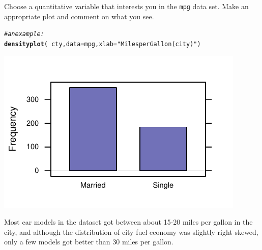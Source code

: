 \documentclass[twoside]{book}\usepackage[]{graphicx}\usepackage[]{xcolor}
\makeatletter
\def\maxwidth{ %
  \ifdim\Gin@nat@width>\linewidth
    \linewidth
  \else
    \Gin@nat@width
  \fi
}
\newcommand{\hlstr}[1]{\textcolor[rgb]{0.192,0.494,0.8}{#1}}%
\newcommand{\hlcom}[1]{\textcolor[rgb]{0.678,0.584,0.686}{\textit{#1}}}%
\newcommand{\hlopt}[1]{\textcolor[rgb]{0,0,0}{#1}}%
\newcommand{\hlstd}[1]{\textcolor[rgb]{0.345,0.345,0.345}{#1}}%
\newcommand{\hlkwc}[1]{\textcolor[rgb]{0.333,0.667,0.333}{#1}}%
\newcommand{\hlkwd}[1]{\textcolor[rgb]{0.737,0.353,0.396}{\textbf{#1}}}%
\newenvironment{kframe}{%
 \def\at@end@of@kframe{}%
 \ifinner\ifhmode%
  \def\at@end@of@kframe{\end{minipage}}%
  \begin{minipage}{\columnwidth}%
 \fi\fi%
 \def\FrameCommand##1{\hskip\@totalleftmargin \hskip-\fboxsep
 \colorbox{shadecolor}{##1}\hskip-\fboxsep
     \hskip-\linewidth \hskip-\@totalleftmargin \hskip\columnwidth}%
 \MakeFramed {\advance\hsize-\width
   \@totalleftmargin\z@ \linewidth\hsize
   \@setminipage}}%
 {\par\unskip\endMakeFramed%
 \at@end@of@kframe}
\newenvironment{knitrout}{}{} %
\newcommand{\Rindex}[1]{\index{\texttt{#1}}}
\newcommand{\dataframe}[1]{{\color{blue!80!black}\texttt{#1}}\Rindex{#1}}
\newcounter{example}[section]
\makeatother
\begin{document}
\begin{problem}
	Choose a quantitative variable that interests you in the \dataframe{mpg}
	data set.  Make an appropriate plot and comment on what you see.
\end{problem}
\begin{solution}
\begin{knitrout}
\color{fgcolor}\begin{kframe}
\begin{alltt}
\hlcom{# an example:}
\hlkwd{densityplot}\hlstd{(}\hlopt{~}\hlstd{cty,} \hlkwc{data} \hlstd{= mpg,} \hlkwc{xlab} \hlstd{=} \hlstr{"Miles per Gallon (city)"}\hlstd{)}
\end{alltt}
\end{kframe}

{\centering \includegraphics[width=\maxwidth]{figures/fig-unnamed-chunk-23-1} 

}



\end{knitrout}
Most car models in the dataset got between about 15-20 miles per gallon in the city, and although the distribution of city fuel economy was slightly right-skewed, only a few models got better than 30 miles per gallon. 
\end{solution}
\end{document}

